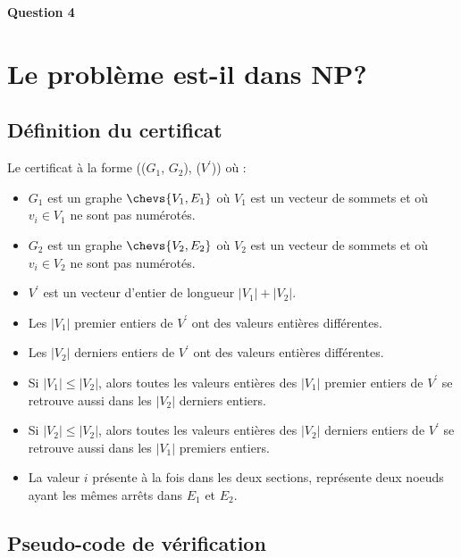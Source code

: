 \documentclass[class=article]{standalone}
\begin{document}
\centerline{\Huge \bf Question 4}
\bigskip

\section*{Le problème est-il dans NP?}
\subsection*{Définition du certificat}

Le certificat à la forme (($G_1$, $G_2$), ($V^\prime$)) où :
\begin{itemize}
  \item $G_1$ est un graphe $\chevs{V_1, E_1}$ où $V_1$ est un vecteur de sommets et où $v_i \in V_1$ ne sont pas numérotés.
  \item $G_2$ est un graphe $\chevs{V_2, E_2}$ où $V_2$ est un vecteur de sommets et où $v_i \in V_2$ ne sont pas numérotés.
  \item $V^\prime$ est un vecteur d'entier de longueur $|V_1| + |V_2|$.
  \item Les $|V_1|$ premier entiers de $V^\prime$ ont des valeurs entières différentes.
  \item Les $|V_2|$ derniers entiers de $V^\prime$ ont des valeurs entières différentes.
  \item Si $|V_1| \leq |V_2|$, alors toutes les valeurs entières 
        des $|V_1|$ premier entiers de $V^\prime$ se retrouve aussi 
        dans les $|V_2|$ derniers entiers.
  \item Si $|V_2| \leq |V_2|$, alors toutes les valeurs entières 
        des $|V_2|$ derniers entiers de $V^\prime$ se retrouve aussi 
        dans les $|V_1|$ premiers entiers.
  \item La valeur $i$ présente à la fois dans les deux sections, représente deux noeuds
        ayant les mêmes arrêts dans $E_1$ et $E_2$.
\end{itemize}

\subsection*{Pseudo-code de vérification}
\end{document}

